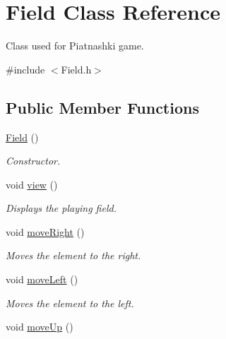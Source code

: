 \hypertarget{class_field}{\section{Field Class Reference}
\label{class_field}
}


Class used for Piatnashki game.  




{\ttfamily \#include $<$Field.\-h$>$}

\subsection*{Public Member Functions}
\begin{DoxyCompactItemize}
\item 
\hypertarget{class_field_a3e804c92273d9159f413f227b535c672}{\hyperlink{class_field_a3e804c92273d9159f413f227b535c672}{Field} ()}\label{class_field_a3e804c92273d9159f413f227b535c672}

\begin{DoxyCompactList}\small\item\em Constructor. \end{DoxyCompactList}\item 
\hypertarget{class_field_a12d20b8d5e376a029550189df6d9a626}{void \hyperlink{class_field_a12d20b8d5e376a029550189df6d9a626}{view} ()}\label{class_field_a12d20b8d5e376a029550189df6d9a626}

\begin{DoxyCompactList}\small\item\em Displays the playing field. \end{DoxyCompactList}\item 
\hypertarget{class_field_ab137ddd411066f075a5a6cb03d64b2d8}{void \hyperlink{class_field_ab137ddd411066f075a5a6cb03d64b2d8}{move\-Right} ()}\label{class_field_ab137ddd411066f075a5a6cb03d64b2d8}

\begin{DoxyCompactList}\small\item\em Moves the element to the right. \end{DoxyCompactList}\item 
\hypertarget{class_field_a36aa9c7feac5b4421c182b2a03f1b404}{void \hyperlink{class_field_a36aa9c7feac5b4421c182b2a03f1b404}{move\-Left} ()}\label{class_field_a36aa9c7feac5b4421c182b2a03f1b404}

\begin{DoxyCompactList}\small\item\em Moves the element to the left. \end{DoxyCompactList}\item 
\hypertarget{class_field_a729a3b94f4985927218d335e490741b6}{void \hyperlink{class_field_a729a3b94f4985927218d335e490741b6}{move\-Up} ()}\label{class_field_a729a3b94f4985927218d335e490741b6}


\end{DoxyCompactItemize}
